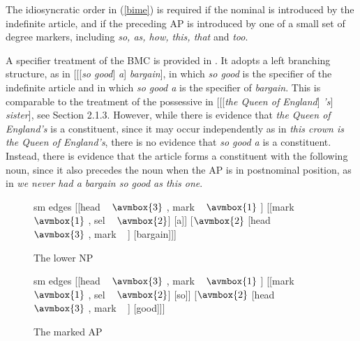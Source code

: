 \documentclass[output=paper]{langsci/langscibook}
\begin{document}
\noindent
The idiosyncratic order in (\ref{bime}) is required if the nominal is introduced 
by the indefinite article, and if the preceding AP is introduced by one of a small 
set of degree markers, including \emph{so, as, how, this, that} and \emph{too}. 

A specifier treatment of the BMC is provided in \citet[201]{GS00}. It adopts  
a left branching structure, as in  [[[\emph{so good}] \emph{a}] \emph{bargain}], 
in which \emph{so good} is the specifier of the indefinite article and in which 
\emph{so good a} is the specifier of \emph{bargain}. This is comparable to the 
treatment of the possessive in [[[\emph{the Queen of England}] \emph{'s}] \emph{sister}],
see Section 2.1.3.  
However, while there is evidence that \emph{the Queen of England's} is a constituent,
since it may occur independently as in \emph{this crown is the Queen of England's}, there is 
no evidence that \emph{so good a} is a constituent. Instead, there is evidence that 
the article forms a constituent with the following noun, since it also precedes the noun 
when the AP is in postnominal position, as in \emph{we never had a bargain so good as this one}.

\begin{figure}
	\centering
	\begin{forest}
sm edges
[{[{\sc head} ~ $\avmbox{3}$  , {\sc mark} ~ $\avmbox{1}$ ]}
		[{[{\sc mark} ~ $\avmbox{1}$ , {\sc sel} ~ $\avmbox{2}$]} [a]]
		[{$\avmbox{2}$ [{\sc head} ~ $\avmbox{3}$ , {\sc mark} ~ ]} [bargain]]]
	\end{forest}
	\caption{\label{aprob} The lower NP }
\end{figure}

\begin{figure}
	\centering
	\begin{forest}
sm edges
[{[{\sc head} ~ $\avmbox{3}$  , {\sc mark} ~ $\avmbox{1}$ ]}
		[{[{\sc mark} ~ $\avmbox{1}$ , {\sc sel} ~ $\avmbox{2}$]} [so]]
		[{$\avmbox{2}$ [{\sc head} ~ $\avmbox{3}$ , {\sc mark} ~ ]} [good]]]
	\end{forest}
	\caption{\label{sohow} The marked AP }
\end{figure}
\end{document}
